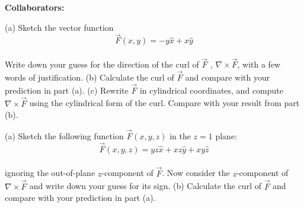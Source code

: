 \documentclass[11pt,letterpaper,boxed]{hmcpset}
\begin{document}
	
	\noindent\textbf{Collaborators:} 
	
	
	\begin{problem}  (a) Sketch the vector function $$\Vec{F}(x,y) = -y\hat{x} + x\hat{y}$$ \\
Write down your guess for the direction of the curl of $\vec{F}$ , $\nabla \times \vec{F}$, with a few words of justification.
(b) Calculate the curl of $\vec{F}$ and compare with your prediction in part (a).
(c) Rewrite $\vec{F}$ in cylindrical coordinates, and compute $\nabla \times \vec{F}$ using the cylindrical form of the curl.
Compare with your result from part (b).
		
	\end{problem}
	
	\begin{solution}
		\vfill
	\end{solution}
	\newpage

	\begin{problem} (a) Sketch the following function $\vec{F}(x,y,z)$ in the $z = 1$ plane:
$$\vec{F}(x,y,z) = yz\hat{x} + xz\hat{y} + xy\hat{z}$$ \\
ignoring the out-of-plane $z$-component of $\vec{F}$. Now consider the $z$-component of $\nabla \times \vec{F}$ and write down your guess for its sign.
(b) Calculate the curl of $\vec{F}$ and compare with your prediction in part (a).
	\end{problem}
	\begin{solution}
		\vfill
	\end{solution}
	\newpage
	
\end{document}
